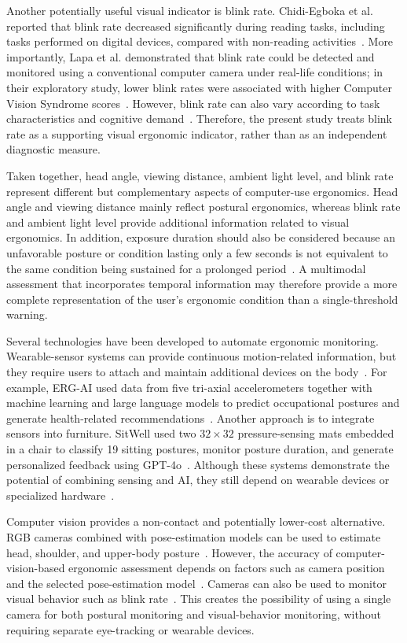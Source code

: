 Another potentially useful visual indicator is blink rate. Chidi-Egboka et al. reported that blink rate decreased significantly during reading tasks, including tasks performed on digital devices, compared with non-reading activities~\cite{ref9}. More importantly, Lapa et al. demonstrated that blink rate could be detected and monitored using a conventional computer camera under real-life conditions; in their exploratory study, lower blink rates were associated with higher Computer Vision Syndrome scores~\cite{ref10}. However, blink rate can also vary according to task characteristics and cognitive demand~\cite{ref11}. Therefore, the present study treats blink rate as a supporting visual ergonomic indicator, rather than as an independent diagnostic measure.

Taken together, head angle, viewing distance, ambient light level, and blink rate represent different but complementary aspects of computer-use ergonomics. Head angle and viewing distance mainly reflect postural ergonomics, whereas blink rate and ambient light level provide additional information related to visual ergonomics. In addition, exposure duration should also be considered because an unfavorable posture or condition lasting only a few seconds is not equivalent to the same condition being sustained for a prolonged period~\cite{ref2,ref12}. A multimodal assessment that incorporates temporal information may therefore provide a more complete representation of the user's ergonomic condition than a single-threshold warning.

Several technologies have been developed to automate ergonomic monitoring. Wearable-sensor systems can provide continuous motion-related information, but they require users to attach and maintain additional devices on the body~\cite{ref13}. For example, ERG-AI used data from five tri-axial accelerometers together with machine learning and large language models to predict occupational postures and generate health-related recommendations~\cite{ref14}. Another approach is to integrate sensors into furniture. SitWell used two $32 \times 32$ pressure-sensing mats embedded in a chair to classify 19 sitting postures, monitor posture duration, and generate personalized feedback using GPT-4o~\cite{ref15}. Although these systems demonstrate the potential of combining sensing and AI, they still depend on wearable devices or specialized hardware~\cite{ref14,ref15}.

Computer vision provides a non-contact and potentially lower-cost alternative. RGB cameras combined with pose-estimation models can be used to estimate head, shoulder, and upper-body posture~\cite{ref16}. However, the accuracy of computer-vision-based ergonomic assessment depends on factors such as camera position and the selected pose-estimation model~\cite{ref16}. Cameras can also be used to monitor visual behavior such as blink rate~\cite{ref10}. This creates the possibility of using a single camera for both postural monitoring and visual-behavior monitoring, without requiring separate eye-tracking or wearable devices.

